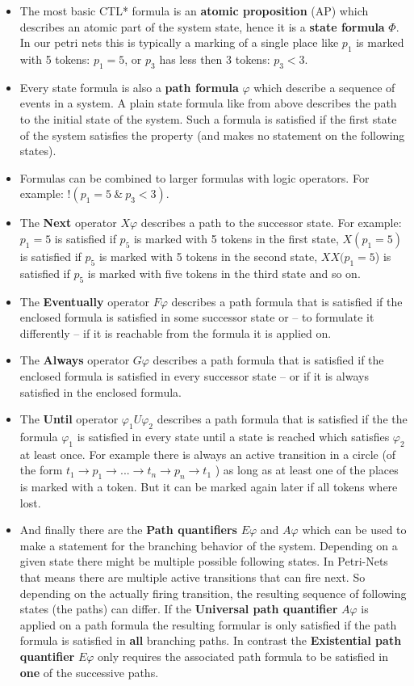 \begin{itemize}
  \item The most basic CTL* formula is an \textbf{atomic proposition} (AP) which describes an atomic part of the system state, hence it is a \textbf{state formula} $\Phi$. 
  In our petri nets this is typically a marking of a single place like $p_1$ is marked with 5 tokens: $p_1=5$, or $p_3$ has less then 3 tokens: $p_3<3$.
  \item Every state formula is also a \textbf{path formula} $\varphi$ which describe a sequence of events in a system.
  A plain state formula like from above describes the path to the initial state of the system. Such a formula is satisfied if the first state of the system satisfies the property (and makes no statement on the following states).
  \item Formulas can be combined to larger formulas with logic operators. For example: $!(p_1=5\ \&\ p_3<3)$.
  \item The \textbf{Next} operator $X\varphi$ describes a path to the successor state. For example: $p_1=5$ is satisfied if $p_5$ is marked with 5 tokens in the first state, $X(p_1=5)$ is satisfied if $p_5$ is marked with 5 tokens in the second state, $XX(p_1=5$) is satisfied if $p_5$ is marked with five tokens in the third state and so on.
  \item The \textbf{Eventually} operator $F\varphi$ describes a path formula that is satisfied if the enclosed formula is satisfied in some successor state or -- to formulate it differently -- if it is reachable from the formula it is applied on.
  \item The \textbf{Always} operator $G\varphi$ describes a path formula that is satisfied if the enclosed formula is satisfied in every successor state -- or if it is always satisfied in the enclosed formula.
  \item The \textbf{Until} operator $\varphi_1 U\varphi_2$ describes a path formula that is satisfied if the the formula $\varphi_1$ is satisfied in every state until a state is reached which satisfies $\varphi_2$ at least once.
  For example there is always an active transition in a circle (of the form $t_1\rightarrow p_1 \rightarrow ... \rightarrow t_n \rightarrow p_n \rightarrow t_1$ ) as long as at least one of the places is marked with a token.
  But it can be marked again later if all tokens where lost.
  \item And finally there are the \textbf{Path quantifiers} $E\varphi$ and $A\varphi$ which can be used to make a statement for the branching behavior of the system.
  Depending on a given state there might be multiple possible following states.
  In Petri-Nets that means there are multiple active transitions that can fire next.
  So depending on the actually firing transition, the resulting sequence of following states (the paths) can differ.
  If the \textbf{Universal path quantifier} $A\varphi$ is applied on a path formula the resulting formular is only satisfied if the path formula is satisfied in \textbf{all} branching paths.
  In contrast the \textbf{Existential path quantifier} $E\varphi$ only requires the associated path formula to be satisfied in \textbf{one} of the successive paths.
\end{itemize}
